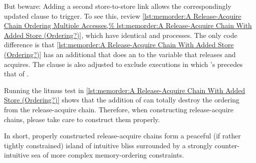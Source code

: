\begin{listing}

\caption{A Release-Acquire Chain Ordering Multiple Accesses}
\label{lst:memorder:A Release-Acquire Chain Ordering Multiple Accesses}
\end{listing}

\begin{listing}

\caption{A Release-Acquire Chain With Added Store (Ordering?)}
\label{lst:memorder:A Release-Acquire Chain With Added Store (Ordering?)}
\end{listing}

But beware:
Adding a second store-to-store link allows the correspondingly updated
 clause to trigger.
To see this, review
\cref{lst:memorder:A Release-Acquire Chain Ordering Multiple Accesses,%
lst:memorder:A Release-Acquire Chain With Added Store (Ordering?)},
which have identical  and  processes.
The only code difference is that
\cref{lst:memorder:A Release-Acquire Chain With Added Store (Ordering?)}
has an additional  that does an  to
the  variable that  releases and  acquires.
The  clause is also adjusted to exclude executions in which
's  precedes that of .

Running the litmus test in
\cref{lst:memorder:A Release-Acquire Chain With Added Store (Ordering?)}
shows that the addition of  can totally destroy the
ordering from the release-acquire chain.
Therefore, when constructing release-acquire chains, please take care
to construct them properly.

\QuickQuizEnd

In short, properly constructed release-acquire chains form a peaceful
(if rather tightly constrained)
island of intuitive bliss surrounded by a strongly counter-intuitive
sea of more complex memory-ordering constraints.

